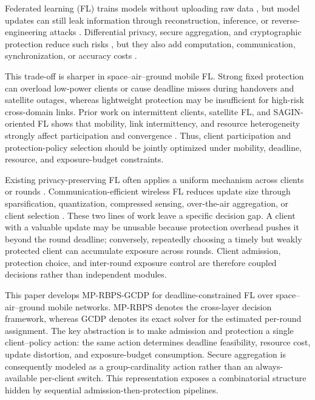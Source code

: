 \documentclass[preprint,12pt]{elsarticle}
\begin{document}
Federated learning (FL) trains models without uploading raw data \cite{mcmahan2017fedavg,kairouz2021advances}, but model updates can still leak information through reconstruction, inference, or reverse-engineering attacks \cite{zhu2019deep,zhao2025federation}. Differential privacy, secure aggregation, and cryptographic protection reduce such risks \cite{bonawitz2017secureagg,mansouri2023sok,wei2023pfl_dp,yuan2023amplitude}, but they also add computation, communication, synchronization, or accuracy costs \cite{yuan2023privacyresource,zheng2023aggregation}.

This trade-off is sharper in space--air--ground mobile FL. Strong fixed protection can overload low-power clients or cause deadline misses during handovers and satellite outages, whereas lightweight protection may be insufficient for high-risk cross-domain links. Prior work on intermittent clients, satellite FL, and SAGIN-oriented FL shows that mobility, link intermittency, and resource heterogeneity strongly affect participation and convergence \cite{ribero2023intermittent,razmi2022ground,tang2023flsagin,qin2024dfrl}. Thus, client participation and protection-policy selection should be jointly optimized under mobility, deadline, resource, and exposure-budget constraints.

Existing privacy-preserving FL often applies a uniform mechanism across clients or rounds \cite{bonawitz2017secureagg,mansouri2023sok,wei2023pfl_dp}. Communication-efficient wireless FL reduces update size through sparsification, quantization, compressed sensing, over-the-air aggregation, or client selection \cite{oh2023fedqcs,oh2024fedvqcs,liu2023adaptivequant,kim2023beamforming,chen2024clientselection,dong2024aoi}. These two lines of work leave a specific decision gap. A client with a valuable update may be unusable because protection overhead pushes it beyond the round deadline; conversely, repeatedly choosing a timely but weakly protected client can accumulate exposure across rounds. Client admission, protection choice, and inter-round exposure control are therefore coupled decisions rather than independent modules.

This paper develops MP-RBPS-GCDP for deadline-constrained FL over space--air--ground mobile networks. MP-RBPS denotes the cross-layer decision framework, whereas GCDP denotes its exact solver for the estimated per-round assignment. The key abstraction is to make admission and protection a single client--policy action: the same action determines deadline feasibility, resource cost, update distortion, and exposure-budget consumption. Secure aggregation is consequently modeled as a group-cardinality action rather than an always-available per-client switch. This representation exposes a combinatorial structure hidden by sequential admission-then-protection pipelines.
\end{document}
